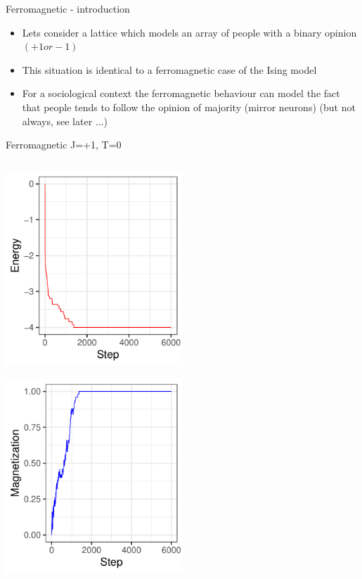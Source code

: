 \documentclass{beamer}
\begin{document}
\begin{frame}{Ferromagnetic - introduction}
\begin{itemize}
\item Lets consider a lattice which models an array of people with a binary opinion $(+1 or -1)$
\item This situation is identical to a ferromagnetic case of the Ising model
\item For a sociological context the ferromagnetic behaviour can model the fact that people tends to follow the opinion of majority (mirror neurons)  (but not always, see later ...)

\end{itemize}
\end{frame}

\begin{frame}{Ferromagnetic J=+1, T=0}
\begin{columns}
\begin{column}{0.5\textwidth}
    \begin{center}
     \includegraphics[width=0.5\textwidth]{Pic/J+1_10_6000_T=0_ENERGY.pdf}
     \end{center}
         \begin{center}
     \includegraphics[width=0.5\textwidth]{Pic/J+1_10_6000_T=0_Magnetization.pdf}

\end{center}
\end{column}
\end{columns}
\end{frame}
\end{document}
